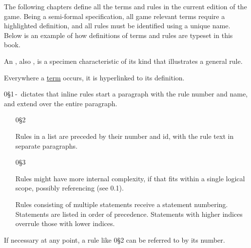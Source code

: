 The following chapters define all the terms and rules in the current edition of the game.
Being a semi-formal specification, all game relevant terms require a highlighted definition, and all rules must be identified using a unique name.
Below is an example of how definitions of terms and rules are typeset in this book.\medskip

An \label{term:example}, also , is a specimen characteristic of its kind that illustrates a general rule.\medskip

Everywhere a \hyperref[term:example]{term} occurs, it is hyperlinked to its definition.\medskip

0\S{}1\,-\, dictates that inline rules start a paragraph with the rule number and name, and extend over the entire paragraph.\medskip

\begin{itemize}
    \item[0\S{}2]

    Rules in a list are preceded by their number and id, with the rule text in separate paragraphs.

    \item[0\S{}3]

    Rules might have more internal complexity, if that fits within a single logical scope, possibly referencing  (see 0.1).

    \begin{stmts}
        \stmt{} Rules consisting of multiple statements receive a statement numbering.
        \stmt{} Statements are listed in order of precedence.
        \stmt{} Statements with higher indices overrule those with lower indices.
    \end{stmts}
\end{itemize}\medskip

If necessary at any point, a rule like 0\S{}2 can be referred to by its number.